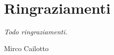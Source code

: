 \documentclass[Tesi.tex]{subfiles}
\begin{document}
\clearpage\thispagestyle{empty}




\chapter*{Ringraziamenti}

\textit{{\color{color_dedica}Todo ringraziamenti.}}\\

\begin{comment}
	\textit{{\color{color_dedica}Desidero ringraziare innanzitutto la mia famiglia, che mi ha sempre dato supporto in ogni mia scelta. }}\\
	
	\textit{{\color{color_dedica}Ringrazio Roberto, Mattia e Lisa di Wintech S.P.A, che mi hanno offerto questa opportunità di stage e mi hanno accompagnato durante lo svolgimento, facendomi crescere professionalmente. }}\\
	
	\textit{{\color{color_dedica}Ringrazio il prof. Paolo Baldan per avermi seguito e consigliato per la stesura della tesi. }}\\
	
	\textit{{\color{color_dedica}Ringrazio tutti i miei compagni di corso ed i miei amici, che mi sono stati vicini e mi hanno sempre spronato a dare il massimo.}}
\end{comment}
\begin{flushright}
	Mirco Cailotto
\end{flushright}

\clearpage
\end{document}

